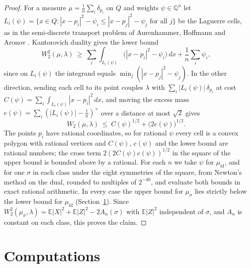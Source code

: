 \documentclass[11pt]{amsart}
\theoremstyle{definition}
\theoremstyle{remark}
\numberwithin{equation}{section}
\newcommand{\E}{\mathbb{E}}
\begin{document}
\begin{proof}
For a measure $\mu=\frac1n\sum_i\delta_{p_i}$ on $Q$ and weights $\psi\in\mathbb{Q}^n$ let
$L_i(\psi)=\{x\in Q:|x-p_i|^2-\psi_i\le|x-p_j|^2-\psi_j\text{ for all }j\}$ be the Laguerre cells, as in the semi-discrete transport problem of Aurenhammer, Hoffmann and
Aronov \cite{AHA}. Kantorovich duality
gives the lower bound
\[
W_2^2(\mu,\lambda)\ \ge\ \sum_i\int_{L_i(\psi)}\bigl(|x-p_i|^2-\psi_i\bigr)\,dx+\frac1n\sum_i\psi_i ,
\]
since on $L_i(\psi)$ the integrand equals $\min_j(|x-p_j|^2-\psi_j)$. In the other direction, sending each cell to its
point couples $\lambda$ with $\sum_i|L_i(\psi)|\,\delta_{p_i}$ at cost $C(\psi)=\sum_i\int_{L_i(\psi)}|x-p_i|^2\,dx$,
and moving the excess mass $e(\psi)=\sum_i(|L_i(\psi)|-\frac1n)^+$ over a distance at most $\sqrt2$ gives
\[
W_2(\mu,\lambda)\ \le\ C(\psi)^{1/2}+\bigl(2e(\psi)\bigr)^{1/2}.
\]
The points $p_i$ have rational coordinates, so for rational $\psi$ every cell is a convex polygon with rational
vertices and $C(\psi)$, $e(\psi)$ and the lower bound are rational numbers; the cross term $2(2C(\psi)e(\psi))^{1/2}$ in
the square of the upper bound is bounded above by a rational. For each $n$ we take $\psi$ for $\mu_{\mathrm{id}}$, and
for one $\sigma$ in each class under the eight symmetries of the square, from Newton's method on the dual, rounded to
multiples of $2^{-40}$, and evaluate both bounds in exact rational arithmetic. In every case the upper bound for
$\mu_\sigma$ lies strictly below the lower bound for $\mu_{\mathrm{id}}$ (Section~\ref{sec:numerics}). Since
$W_2^2(\mu_\sigma,\lambda)=\E|X|^2+\E|Z|^2-2A_n(\sigma)$ with $\E|Z|^2$ independent of $\sigma$, and $A_n$ is constant
on each class, this proves the claim.
\end{proof}

\section{Computations}\label{sec:numerics}
\end{document}
